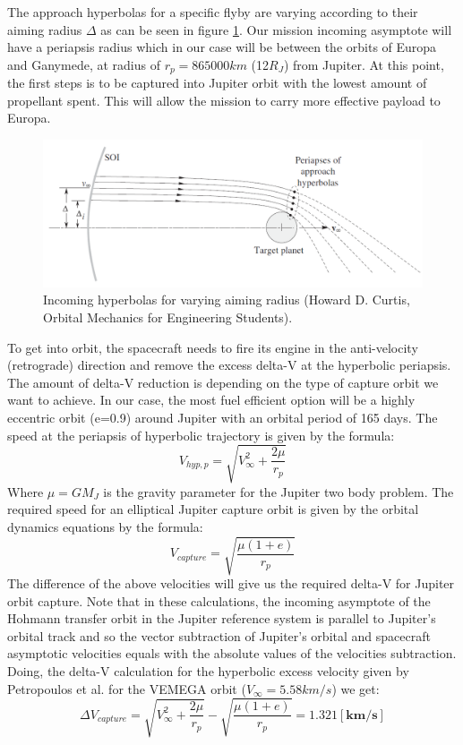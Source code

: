 The approach hyperbolas for a specific flyby are varying according to their aiming radius $\Delta$ as can be seen in figure \ref{fig:joihyp}. Our mission incoming asymptote will have a periapsis radius which in our case will be between the orbits of Europa and Ganymede, at radius of $r_p=865000km$ (12$R_J$) from Jupiter. At this point, the first steps is to be captured into Jupiter orbit with the lowest amount of propellant spent. This will allow the mission to carry more effective payload to Europa. 

\begin{figure}[htb]
\centering
\includegraphics[scale=0.3]{figures/Orbiter/joihyp.png}
\caption{Incoming hyperbolas for varying aiming radius (Howard D. Curtis, Orbital Mechanics for Engineering Students).\cite{orbitals}}
\label{fig:joihyp}
\end{figure}

To get into orbit, the spacecraft needs to fire its engine in the anti-velocity (retrograde) direction and remove the excess delta-V at the hyperbolic periapsis. The amount of delta-V reduction is depending on the type of capture orbit we want to achieve. In our case, the most fuel efficient option will be a highly eccentric orbit (e=0.9) around Jupiter with an orbital period of 165 days. The speed at the periapsis of hyperbolic trajectory is given by the formula:
\begin{equation}
V_{hyp,p}=\sqrt{V_{\infty}^{2}+\frac{2\mu}{r_p}}
\end{equation}
Where $\mu=GM_J$ is the gravity parameter for the Jupiter two body problem. The required speed for an elliptical Jupiter capture orbit is given by the orbital dynamics equations by the formula:
\begin{equation}
V_{capture}=\sqrt{\frac{\mu\left(1+e\right)}{r_p}}
\end{equation}
The difference of the above velocities will give us the required delta-V for Jupiter orbit capture. Note that in these calculations, the incoming asymptote of the Hohmann transfer orbit in the Jupiter reference system is parallel to Jupiter’s orbital track and so the vector subtraction of Jupiter’s orbital and spacecraft asymptotic velocities equals with the absolute values of the velocities subtraction.  Doing, the delta-V calculation for the hyperbolic excess velocity given by Petropoulos et al. for the VEMEGA orbit
($V_\infty=5.58km/s$) we get:
\begin{equation}
\Delta V_{capture}=\sqrt{V_{\infty}^{2}+\frac{2\mu}{r_p}}-\sqrt{\frac{\mu\left(1+e\right)}{r_p}} = \mathbf{1.321 [km/s]}
\end{equation}
